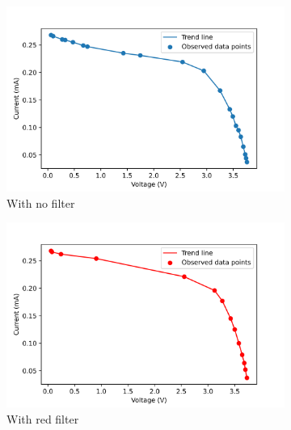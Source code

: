 \documentclass[%
 aip,
 amsmath,amssymb,
 reprint, floatfix%
]{revtex4-2}
\begin{document}
    \begin{figure}
        \centering
        \begin{subfigure}[b]{0.49\textwidth}
            \centering
            \includegraphics[scale = 0.54]{Figures/plot-iv-lamp-nofilter.png}
            \caption{With no filter}
            \label{fig:iv-lamp-nofilter}
        \end{subfigure}
        \hfill
        \begin{subfigure}[b]{0.49\textwidth}
            \centering
            \includegraphics[scale = 0.54]{Figures/plot-iv-lamp-red.png}
            \caption{With red filter}
            \label{fig:iv-lamp-red}
        \end{subfigure}
        \hfill
        \begin{subfigure}[b]{0.49\textwidth}
            \centering

\end{subfigure}
\end{figure}
\end{document}
